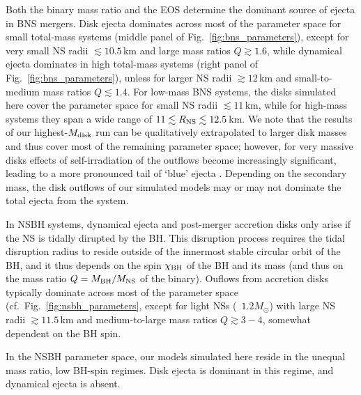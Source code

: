 Both the binary mass ratio and the EOS determine the dominant source of ejecta in BNS mergers. Disk ejecta dominates across most of the parameter space for small total-mass systems (middle panel of Fig.~\ref{fig:bns_parameters}), except for very small NS radii $\lesssim\!10.5$\,km and large mass ratios $Q\gtrsim 1.6$, while dynamical ejecta dominates in high total-mass systems (right panel of Fig.~\ref{fig:bns_parameters}), unless for larger NS radii $\gtrsim\!12$\,km and small-to-medium mass ratios $Q\lesssim 1.4$. For low-mass BNS systems, the disks simulated here cover the parameter space for small NS radii $\lesssim\!11$\,km, while for high-mass systems they span a wide range of $11\lesssim R_{\rm NS}\lesssim 12.5$\,km. We note that the results of our highest-$M_{\rm disk}$ run can be qualitatively extrapolated to larger disk masses and thus cover most of the remaining parameter space; however, for very massive disks effects of self-irradiation of the outflows become increasingly significant, leading to a more pronounced tail of `blue' ejecta \cite{miller_full_2019-1}. Depending on the secondary mass, the disk outflows of our simulated models may or may not dominate the total ejecta from the system.

In NSBH systems, dynamical ejecta and post-merger accretion disks only arise if the NS is tidally dirupted by the BH. This disruption process requires the tidal disruption radius to reside outside of the innermost stable circular orbit of the BH, and it thus depends on the spin $\chi_{\rm BH}$ of the BH and its mass (and thus on the mass ratio $Q = M_{\rm BH}/M_{\rm NS}$ of the binary). Ouflows from accretion disks typically dominate across most of the parameter space (cf.~Fig.~\ref{fig:nsbh_parameters}, except for light NSs (~$1.2M_\odot$) with large NS radii $\gtrsim 11.5$\,km and medium-to-large mass ratios $Q\gtrsim 3-4$, somewhat dependent on the BH spin.

In the NSBH parameter space, our models simulated here reside in the unequal mass ratio, low BH-spin regimes. Disk ejecta is dominant in this regime, and dynamical ejecta is absent.






